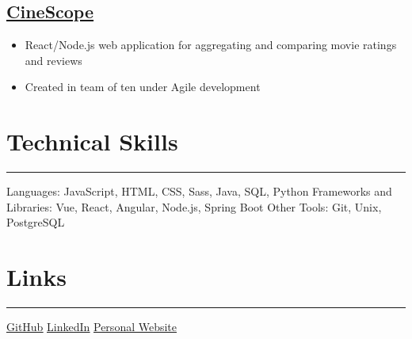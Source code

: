 \documentclass{article}
\begin{document}
\vspace{-1em}
\subsection{\href{https://github.com/WKhiro/CineScope-Client}{\color{NavyBlue}\underline{CineScope}}}
\begin{itemize}
	\itemsep0em
	\item React/Node.js web application for aggregating and comparing movie ratings and reviews
	\item Created in team of ten under Agile development
\end{itemize}

\vspace{-1em}
\section{Technical Skills}
\vspace{-1.5em}
\par\noindent\rule{\textwidth}{0.4pt}
Languages: JavaScript, HTML, CSS, Sass, Java, SQL, Python \newline
Frameworks and Libraries: Vue, React, Angular, Node.js, Spring Boot \newline
Other Tools: Git, Unix, PostgreSQL

\vspace{-0.5em}
\section{Links}
\vspace{-1.5em}	
\par\noindent\rule{\textwidth}{0.4pt}
{\faGithub} {\color{NavyBlue} \href{https://github.com/WKhiro}{\underline{GitHub}}} \space\space
{\color{LinkedInBlue}\faLinkedinSquare} {\color{NavyBlue} \href{https://www.linkedin.com/in/wesley-kok}{\underline{LinkedIn}}} \space\space
{\faFeed} {\color{NavyBlue} \href{https://wkhiro.github.io}{\underline{Personal Website}}}
\end{document}
